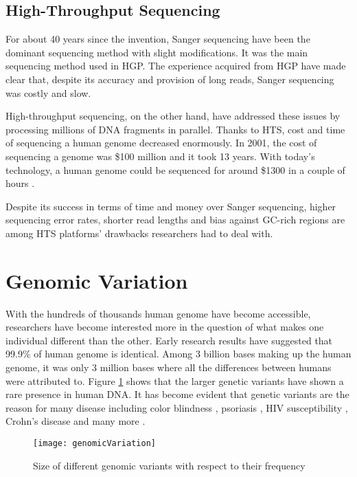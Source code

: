 \subsection{High-Throughput Sequencing}
For about 40 years since the invention, Sanger sequencing have been the dominant sequencing method with slight modifications. It was the main sequencing method used in HGP. The experience acquired from HGP have made clear that, despite its accuracy and provision of long reads, Sanger sequencing was costly and slow.

High-throughput sequencing, on the other hand, have addressed these issues by processing millions of DNA fragments in parallel. Thanks to HTS, cost and time of sequencing a human genome decreased enormously. In 2001, the cost of sequencing a genome was \$100 million and it took 13 years. With today's technology, a human genome could be sequenced for around \$1300 \cite{costOfHumanGenomeProject} in a couple of hours \cite{timeEstimatesPerRun}.

Despite its success in terms of time and money over Sanger sequencing, higher sequencing error rates, shorter read lengths and bias against GC-rich regions \cite{smith2008rapid} are among HTS platforms' drawbacks researchers had to deal with. 

\section{Genomic Variation}

With the hundreds of thousands human genome have become accessible, researchers have become interested more in the question of what makes one individual different than the other. Early research results have suggested that 99.9\% of human genome is identical. Among 3 billion bases making up the human genome, it was only 3 million bases where all the differences between humans were attributed to. Figure \ref{geneticVariants} shows that the larger genetic variants have shown a rare presence in human DNA. It has become evident that genetic variants are the reason for many disease including color blindness \cite{colorBlindness}, psoriasis \cite{hollox2008psoriasis}, HIV susceptibility \cite{gonzalez2005influence}, Crohn's disease \cite{fellermann2006chromosome} and many more \cite{aitman2006copy}. 

\begin{figure}[ht]
\centering
\texttt{[image: genomicVariation]}
\caption{Size of different genomic variants with respect to their frequency}
\label{geneticVariants}
\end{figure}



